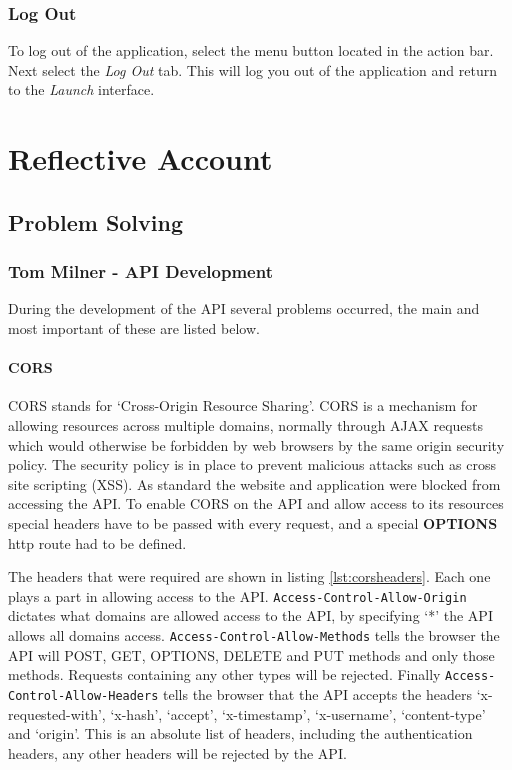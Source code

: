 \documentclass[11pt,a4paper]{report}
\begin{document}
\subsection{Log Out}
\label{log_out}

To log out of the application, select the menu button located in the action bar. Next select the \emph{Log Out} tab. This will log you out of the application and return to the \emph{Launch} interface.



\chapter{Reflective Account}
\label{sec:reflective-account}
\newpage

\section{Problem Solving}
\label{sec:problem-solving}

\subsection{Tom Milner - API Development}
During the development of the API several problems occurred, the main and most important of these are listed below.

\subsubsection{CORS}
CORS stands for `Cross-Origin Resource Sharing'. CORS is a mechanism for allowing resources across multiple domains, normally through AJAX requests which would otherwise be forbidden by web browsers by the same origin security policy. The security policy is in place to prevent malicious attacks such as cross site scripting (XSS). As standard the website and application were blocked from accessing the API. To enable CORS on the API and allow access to its resources special headers have to be passed with every request, and a special \textbf{OPTIONS} http route had to be defined. 

The headers that were required are shown in listing \ref{lst:corsheaders}. Each one plays a part in allowing access to the API. \lstinline$Access-Control-Allow-Origin$ dictates what domains are allowed access to the API, by specifying `*' the API allows all domains access. \lstinline$Access-Control-Allow-Methods$ tells the browser the API will POST, GET, OPTIONS, DELETE and PUT methods and only those methods. Requests containing any other types will be rejected. Finally \lstinline$Access-Control-Allow-Headers$ tells the browser that the API accepts the headers `x-requested-with', `x-hash', `accept', `x-timestamp', `x-username', `content-type' and `origin'. This is an absolute list of headers, including the authentication headers, any other headers will be rejected by the API. 
\end{document}
